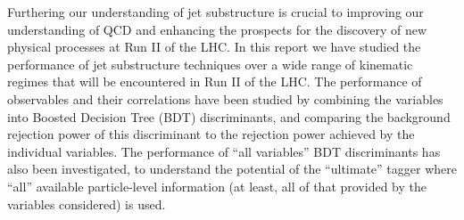
Furthering our understanding of jet substructure is crucial to improving our understanding of QCD and enhancing the prospects for the discovery of new physical processes at Run II of the LHC. In this report we have studied the performance of jet substructure techniques over a wide range of kinematic regimes that will be encountered in Run II of the LHC. The performance of observables and their correlations have been studied by combining the variables into Boosted Decision Tree (BDT) discriminants, and comparing the background rejection power of this discriminant to the rejection power achieved by the individual variables. The performance of ``all variables'' BDT discriminants has also been investigated, to understand the potential of the ``ultimate'' tagger where ``all'' available particle-level information (at least, all of that provided by the variables considered) is used.


